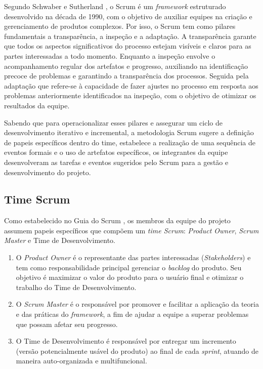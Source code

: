 \documentclass[
	12pt,				%
	openany,			%
	oneside,			%
	a4paper,			%
	english,			%
	french,				%
	spanish,			%
	brazil				%
	]{abntex2}
\begin{document}
Segundo Schwaber e Sutherland \cite{scrumguide}, o Scrum é um \textit{framework} estruturado desenvolvido na década de 1990, com o objetivo de auxiliar equipes na criação e gerenciamento de produtos complexos. Por isso,  o Scrum tem como pilares fundamentais a transparência, a inspeção e a adaptação. A transparência garante que todos os aspectos significativos do processo estejam visíveis e claros para as partes interessadas a todo momento. Enquanto a inspeção envolve o acompanhamento regular dos artefatos e progresso, auxiliando na identificação precoce de problemas e garantindo a transparência dos processos. Seguida pela adaptação que refere-se à capacidade de fazer ajustes no processo  em resposta aos problemas anteriormente identificados na inspeção, com o objetivo de otimizar os resultados da equipe.

Sabendo que para operacionalizar esses pilares e assegurar um ciclo de desenvolvimento iterativo e incremental, a metodologia Scrum sugere a definição de papeis específicos dentro do time, estabelece a realização de uma sequência de eventos formais e o uso de artefatos específicos, os integrantes da equipe desenvolveram as tarefas e eventos sugeridos pelo Scrum para a gestão e desenvolvimento do projeto.
%
\subsection{Time Scrum}
Como estabelecido no Guia do Scrum \cite{scrumguide}, os membros da equipe do projeto assumem papeis específicos que compõem um \textit{time Scrum}: \textit{Product Owner}, \textit{Scrum Master} e Time de Desenvolvimento. 
%
\begin{enumerate}[label=\roman*)]
	\item O \textit{Product Owner} é o representante das partes interessadas (\textit{Stakeholders}) e tem como responsabilidade principal gerenciar o \textit{backlog} do produto. Seu objetivo é maximizar o valor do produto para o usuário final e otimizar o trabalho do Time de Desenvolvimento. 
	\item O \textit{Scrum Master}  é o responsável por promover e facilitar a aplicação da teoria e das práticas do \textit{framework}, a fim de ajudar a equipe a superar problemas que possam afetar seu progresso. 
	\item O Time de Desenvolvimento é responsável por entregar um incremento (versão potencialmente usável do produto) ao final de cada \textit{sprint}, atuando de maneira auto-organizada e multifuncional.
\end{enumerate}
%
\end{document}
